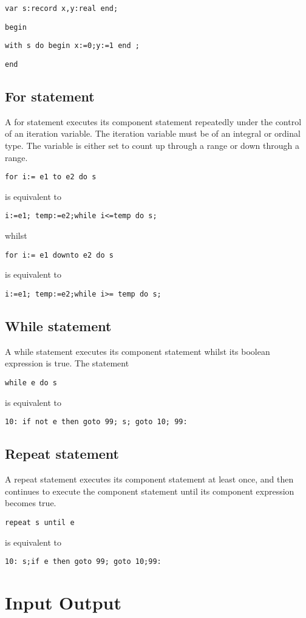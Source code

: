 {\texttt{var s:record x,y:real end;}

\texttt{begin}

\texttt{with s do begin x:=0;y:=1 end ;}

\texttt{end}


\subsection{For statement}

A for statement executes its component statement repeatedly under
the control of an iteration variable. The iteration variable
must be of an integral or ordinal type. The variable is either set to count
up through a range or down through a range.

\texttt{for i:= e1 to e2 do s}

is equivalent to

\texttt{i:=e1; temp:=e2;while i<=temp do s;}

whilst

\texttt{for i:= e1 downto e2 do s}

is equivalent to

\texttt{i:=e1; temp:=e2;while i>= temp do s;}


\subsection{While statement}

A while statement executes its component statement whilst its
boolean expression is true. The statement

\texttt{while e do s}

is equivalent to

\texttt{10: if not e then goto 99; s; goto 10; 99:}


\subsection{Repeat statement}

A repeat statement executes its component statement at least
once, and then continues to execute the component statement until its component
expression becomes true.

\texttt{repeat s until e}

is equivalent to

\texttt{10: s;if e then goto 99; goto 10;99:}


\section{Input Output }

}
